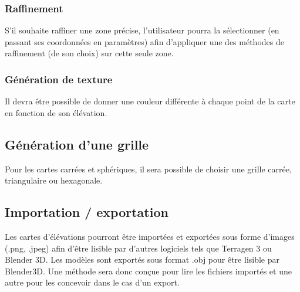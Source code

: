 \subsubsection{Raffinement}
S'il souhaite raffiner une zone précise, l'utilisateur pourra la sélectionner (en passant ses coordonnées en paramètres) afin d'appliquer une des méthodes de raffinement (de son choix) sur cette seule zone.




\subsubsection{Génération de texture}
Il devra être possible de donner une couleur différente à chaque point de la carte en
fonction de son élévation.

\subsection {Génération d'une grille}

Pour les cartes carrées et sphériques, il sera possible de choisir une grille carrée, triangulaire ou hexagonale.

\subsection{Importation / exportation}
Les cartes d'élévations pourront être importées et exportées sous forme
d'images (.png, .jpeg) afin d'être lisible par d'autres logiciels
tels que Terragen 3 ou Blender 3D. \newline
Les modèles sont exportés sous format .obj pour être lisible par Blender3D.
Une méthode sera donc conçue pour lire les fichiers importés et une autre pour les concevoir dans le cas d'un export. 

